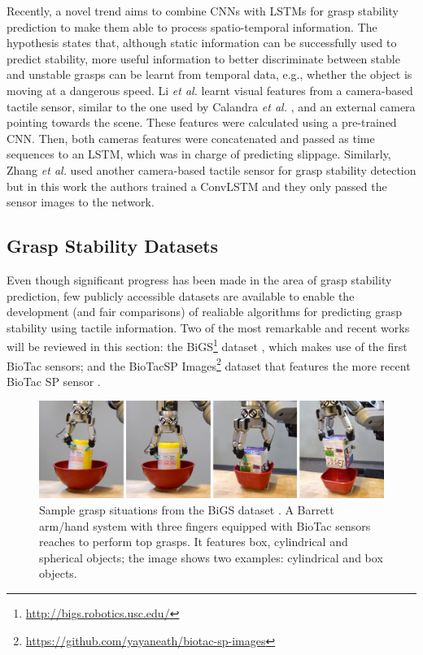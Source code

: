 Recently, a novel trend aims to combine \acp{CNN} with \acp{LSTM} for grasp stability prediction to make them able to process spatio-temporal information. The hypothesis states that, although static information can be successfully used to predict stability, more useful information to better discriminate between stable and unstable grasps can be learnt from temporal data, e.g., whether the object is moving at a dangerous speed. Li \emph{et al.} \cite{Li2018} learnt visual features from a camera-based tactile sensor, similar to the one used by Calandra \emph{et al.} \cite{Calandra2017}, and an external camera pointing towards the scene. These features were calculated using a pre-trained \ac{CNN}. Then, both cameras features were concatenated and passed as time sequences to an \ac{LSTM}, which was in charge of predicting slippage. Similarly, Zhang \emph{et al.} \cite{Zhang2018} used another camera-based tactile sensor for grasp stability detection but in this work the authors trained a \ac{ConvLSTM} and they only passed the sensor images to the network.

\subsection{Grasp Stability Datasets}

Even though significant progress has been made in the area of grasp stability prediction, few publicly accessible datasets are available to enable the development (and fair comparisons) of realiable algorithms for predicting grasp stability using tactile information. Two of the most remarkable and recent works will be reviewed in this section: the \acf{BiGS}\footnote{\url{http://bigs.robotics.usc.edu/}} dataset \cite{Su2015b}, which makes use of the first BioTac sensors; and the BioTacSP Images\footnote{\url{https://github.com/yayaneath/biotac-sp-images}} dataset \cite{Zapata2018} that features the more recent BioTac SP sensor \cite{Syntouch2018}.

\begin{figure}[!htb]
    \centering
    \includegraphics[width=\linewidth]{Figures/Tactile/bigs}
    \caption{Sample grasp situations from the \ac{BiGS} dataset \cite{Su2015b}. A Barrett arm/hand system with three fingers equipped with BioTac sensors reaches to perform top grasps. It features box, cylindrical and spherical objects; the image shows two examples: cylindrical and box objects.}
    \label{fig:tactile:bigs}
\end{figure}

